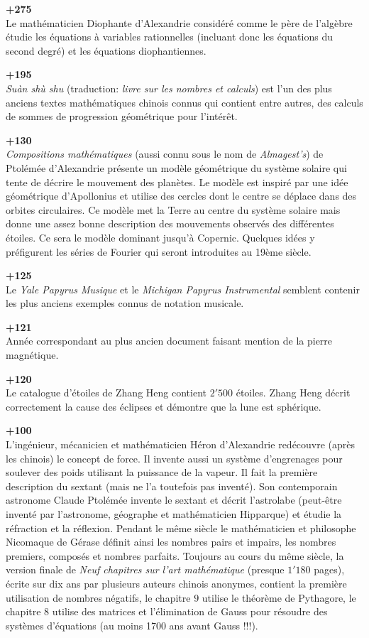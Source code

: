 \textbf{+275}\\
Le mathématicien Diophante d'Alexandrie considéré comme le père de l'algèbre étudie les équations à variables rationnelles (incluant donc les équations du second degré) et les équations diophantiennes.

\textbf{+195}\\
\textit{Suàn shù shu} (traduction: \textit{livre sur les nombres et calculs}) est l'un des plus anciens textes mathématiques chinois connus qui contient entre autres, des calculs de sommes de progression géométrique pour l'intérêt.

\textbf{+130}\\
\textit{Compositions mathématiques} (aussi connu sous le nom de \textit{Almagest's}) de Ptolémée d'Alexandrie présente un modèle géométrique du système solaire qui tente de décrire le mouvement des planètes. Le modèle est inspiré par une idée géométrique d'Apollonius et utilise des cercles dont le centre se déplace dans des orbites circulaires. Ce modèle met la Terre au centre du système solaire mais donne une assez bonne description des mouvements observés des différentes étoiles. Ce sera le modèle dominant jusqu'à Copernic. Quelques idées y préfigurent les séries de Fourier qui seront introduites au 19ème siècle.

\textbf{+125}\\
Le \textit{Yale Papyrus Musique} et le \textit{Michigan Papyrus Instrumental} semblent contenir les plus anciens exemples connus de notation musicale.

\textbf{+121}\\
Année correspondant au plus ancien document faisant mention de la pierre magnétique.

\textbf{+120}\\
Le catalogue d'étoiles de Zhang Heng contient $2'500$ étoiles. Zhang Heng décrit correctement la cause des éclipses et démontre que la lune est sphérique.

\textbf{+100}\\
L'ingénieur, mécanicien et mathématicien Héron d'Alexandrie redécouvre (après les chinois) le concept de force. Il invente aussi un système d'engrenages pour soulever des poids utilisant la puissance de la vapeur. Il fait la première description du sextant (mais ne l'a toutefois pas inventé). Son contemporain astronome Claude Ptolémée invente le sextant et décrit l'astrolabe (peut-être inventé par l'astronome, géographe et mathématicien Hipparque) et étudie la réfraction et la réflexion. Pendant le même siècle le mathématicien et philosophe Nicomaque de Gérase définit ainsi les nombres pairs et impairs, les nombres premiers, composés et nombres parfaits.  Toujours au cours du même siècle, la version finale de \textit{Neuf chapitres sur l'art mathématique} (presque $1'180$ pages), écrite sur dix ans par plusieurs auteurs chinois anonymes, contient la première utilisation de nombres négatifs, le chapitre $9$ utilise le théorème de Pythagore, le chapitre $8$ utilise des matrices et l'élimination de Gauss pour résoudre des systèmes d'équations (au moins 1700 ans avant Gauss !!!).

